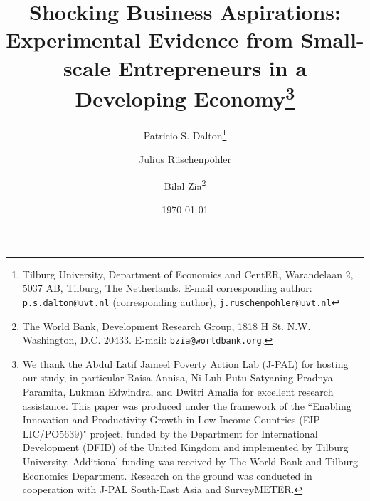 \documentclass[11.5pt]{article}
\begin{document}
\title{\Large \textbf{Shocking Business Aspirations: \\
Experimental Evidence from Small-scale Entrepreneurs in a Developing Economy}\thanks {\scriptsize We thank the Abdul Latif Jameel Poverty Action Lab (J-PAL) for hosting our study, in particular Raisa Annisa, Ni Luh Putu Satyaning Pradnya Paramita, Lukman Edwindra, and Dwitri Amalia for excellent research assistance. This paper was produced under the framework of the \textquotedblleft Enabling Innovation and Productivity Growth in Low Income Countries (EIP-LIC/PO5639)" project, funded by the Department for International Development (DFID) of the United Kingdom and implemented by Tilburg University. Additional funding was received by The World Bank and Tilburg Economics Department. Research on the ground was conducted in cooperation with J-PAL South-East Asia and SurveyMETER.}}

\author{Patricio S. Dalton\thanks{\scriptsize Tilburg University, Department of Economics and CentER, Warandelaan 2, 5037 AB, Tilburg, The Netherlands. E-mail corresponding author: \texttt{p.s.dalton@uvt.nl} (corresponding author), \texttt{j.ruschenpohler@uvt.nl}}
\and Julius R\"uschenp\"ohler\footnotemark[2]
\and Bilal Zia\thanks{\scriptsize The World Bank, Development Research Group, 1818 H St. N.W. Washington, D.C. 20433. E-mail: \texttt{bzia@worldbank.org}.}}


\date{\today}
\maketitle
\singlespace
\end{document}
